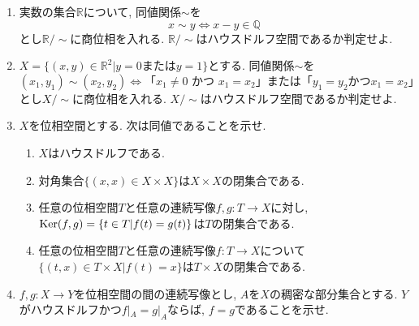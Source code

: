 \documentclass[dvipdfmx,a4paper,11pt]{article}
\newcommand{\R}{\mathbb{R}}
\newcommand{\Q}{\mathbb{Q}}
\theoremstyle{definition}
\begin{document}
\begin{enumerate}[label=\textbf{問}\ref*{sec-Hausdorff}.\arabic*]
\item 実数の集合$\R$について, 同値関係$\sim$を
	$$
	x \sim y \Leftrightarrow x - y \in \Q
	$$
	とし$\R / \sim$に商位相を入れる.  $\R / \sim$はハウスドルフ空間であるか判定せよ. 
		

\item $X = \{(x,y) \in \R^2| \text{$y=0$または$y=1$} \}$とする. 同値関係$\sim$を
	$$
	(x_1,y_1) \sim (x_2,y_2) \Leftrightarrow \text{「$x_1 \neq 0$ かつ $x_1=x_2$」または「$y_1=y_2$かつ$x_1=x_2$」}
	$$
	とし$X / \sim$に商位相を入れる.  $X/ \sim$はハウスドルフ空間であるか判定せよ. 





\item $X$を位相空間とする. 次は同値であることを示せ.
\begin{enumerate}[label=(\roman*)]
 \setlength{\parskip}{0cm}
  \setlength{\itemsep}{0pt} 
\item $X$はハウスドルフである.
\item 対角集合$\{ (x,x) \in X \times X\}$は$X \times X$の閉集合である.
\item 任意の位相空間$T$と任意の連続写像$f,g : T \rightarrow X$に対し, ${\rm Ker}(f,g) = \{ t \in T | f(t) =g(t)\}$は$T$の閉集合である.
\item 任意の位相空間$T$と任意の連続写像$f : T \rightarrow X$について$\{ (t,x) \in T \times X | f(t) =x\}$は$T \times X$の閉集合である.
\end{enumerate}



\item $f,g : X \rightarrow Y$を位相空間の間の連続写像とし, $A$を$X$の稠密な部分集合とする. 
$Y$がハウスドルフかつ$f|_{A} =g|_{A}$ならば, $f =g$であることを示せ. 







	


\end{enumerate}
\end{document}

